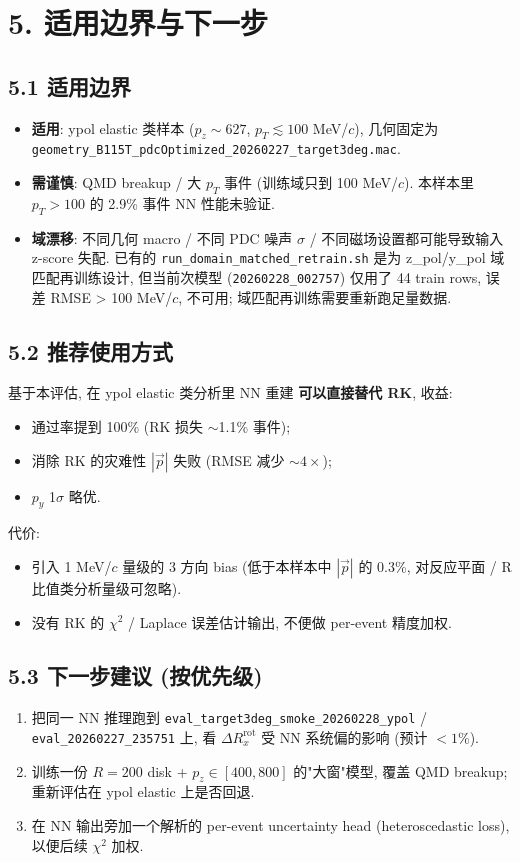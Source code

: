 \documentclass[a4paper,11pt]{article}
\begin{document}
\section{5. 适用边界与下一步}

\subsection*{5.1 适用边界}
\begin{itemize}[nosep]
    \item \textbf{适用}: ypol elastic 类样本 ($p_z\sim 627$, $p_T\lesssim 100$ MeV/$c$), 几何固定为 \texttt{geometry\_B115T\_pdcOptimized\_20260227\_target3deg.mac}.
    \item \textbf{需谨慎}: QMD breakup / 大 $p_T$ 事件 (训练域只到 100 MeV/$c$). 本样本里 $p_T > 100$ 的 2.9\% 事件 NN 性能未验证.
    \item \textbf{域漂移}: 不同几何 macro / 不同 PDC 噪声 $\sigma$ / 不同磁场设置都可能导致输入 z-score 失配. 已有的 \texttt{run\_domain\_matched\_retrain.sh} 是为 z\_pol/y\_pol 域匹配再训练设计, 但当前次模型 (\texttt{20260228\_002757}) 仅用了 44 train rows, 误差 RMSE > 100 MeV/$c$, 不可用; 域匹配再训练需要重新跑足量数据.
\end{itemize}

\subsection*{5.2 推荐使用方式}
基于本评估, 在 ypol elastic 类分析里 NN 重建 \textbf{可以直接替代 RK}, 收益:
\begin{itemize}[nosep]
    \item 通过率提到 100\% (RK 损失 $\sim$1.1\% 事件);
    \item 消除 RK 的灾难性 $|\vec p|$ 失败 (RMSE 减少 $\sim 4\times$);
    \item $p_y$ 1$\sigma$ 略优.
\end{itemize}
代价:
\begin{itemize}[nosep]
    \item 引入 1 MeV/$c$ 量级的 3 方向 bias (低于本样本中 $|\vec p|$ 的 0.3\%, 对反应平面 / R 比值类分析量级可忽略).
    \item 没有 RK 的 $\chi^2$ / Laplace 误差估计输出, 不便做 per-event 精度加权.
\end{itemize}

\subsection*{5.3 下一步建议 (按优先级)}
\begin{enumerate}[nosep]
    \item 把同一 NN 推理跑到 \texttt{eval\_target3deg\_smoke\_20260228\_ypol} / \texttt{eval\_20260227\_235751} 上, 看 $\Delta R_x^\text{rot}$ 受 NN 系统偏的影响 (预计 $<1\%$).
    \item 训练一份 $R = 200$ disk + $p_z\in[400, 800]$ 的"大窗"模型, 覆盖 QMD breakup; 重新评估在 ypol elastic 上是否回退.
    \item 在 NN 输出旁加一个解析的 per-event uncertainty head (heteroscedastic loss), 以便后续 $\chi^2$ 加权.
\end{enumerate}
\end{document}
